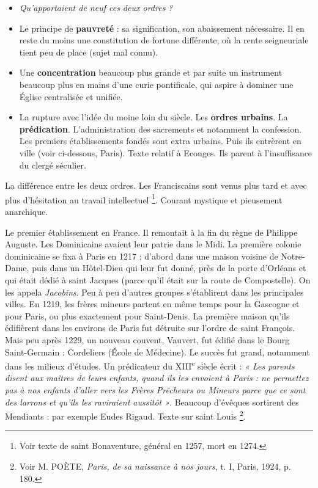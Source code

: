 \documentclass[french,twoside]{book} %
\newlength{\listmod}
\newcommand{\listhead}[1]{\hspace{-1\listmod}\emph{#1}}
\begin{document}
\begin{itemize}[itemsep=0pt,]
\item[]\listhead{Qu’apportaient de neuf ces deux ordres ?}
\item Le principe de {\bfseries pauvreté} : sa signification, son abaissement nécessaire. Il en reste du moins une constitution de fortune différente, où la rente seigneuriale tient peu de place (sujet mal connu).
\item Une {\bfseries concentration} beaucoup plus grande et par suite un instrument beaucoup plus en mains d’une curie pontificale, qui aspire à dominer une Église centralisée et unifiée.
\item La rupture avec l’idée du moine loin du siècle. Les {\bfseries ordres urbains}. La {\bfseries prédication}. L’administration des sacrements et notamment la confession. Les premiers établissements fondés sont extra urbains. Puis ils entrèrent en ville (voir ci-dessous, Paris). Texte relatif à Ecouges. Ils parent à l’insuffisance du clergé séculier.
\end{itemize}
\noindent La différence entre les deux ordres. Les Franciscains sont venus plus tard et avec plus d’hésitation au travail intellectuel \footnote{Voir texte de saint Bonaventure, général en 1257, mort en 1274.}. Courant mystique et pieusement anarchique.\par
Le premier établissement en France. Il remontait à la fin du règne de Philippe Auguste. Les Dominicains avaient leur patrie dans le Midi. La première colonie dominicaine se fixa à Paris en 1217 ; d’abord dans une maison voisine de Notre-Dame, puis dans un Hôtel-Dieu qui leur fut donné, près de la porte d’Orléans et qui était dédié à saint Jacques (parce qu’il était sur la route de Compostelle). On les appela \emph{Jacobins}. Peu à peu d’autres groupes s’établirent dans les principales villes. En 1219, les frères mineurs partent en même temps pour la Gascogne et pour Paris, ou plus exactement pour Saint-Denis. La première maison qu’ils édifièrent dans les environs de Paris fut détruite sur l’ordre de saint François. Mais peu après 1229, un nouveau couvent, Vauvert, fut édifié dans le Bourg Saint-Germain : Cordeliers (École de Médecine). Le succès fut grand, notamment dans les milieux d’études. Un prédicateur du XIII\textsuperscript{e} siècle écrit : \emph{« Les parents disent aux maîtres de leurs enfants, quand ils les envoient à Paris : ne permettez pas à nos enfants d’aller vers les Frères Prêcheurs ou Mineurs parce que ce sont des larrons et qu’ils les raviraient aussitôt »}. Beaucoup d’évêques sortirent des Mendiants : par exemple Eudes Rigaud. Texte sur saint Louis \footnote{ Voir M. POÈTE, {\itshape Paris, de sa naissance à nos jours}, t. I, Paris, 1924, p. 180.}.\par
\end{document}
